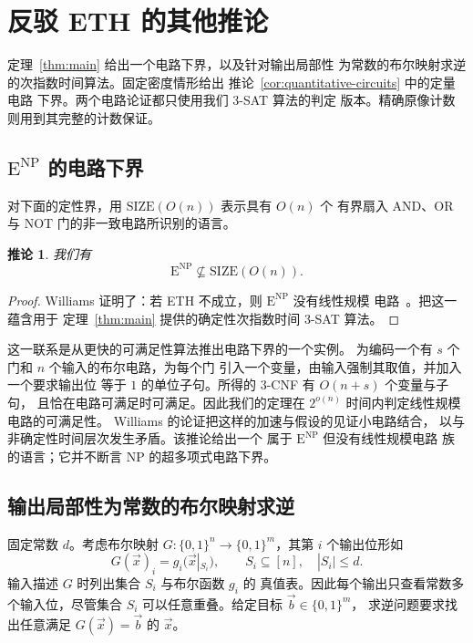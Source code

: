 \documentclass[11pt,reqno]{amsart}
\numberwithin{equation}{section}
\newtheorem{corollary}[theorem]{推论}
\theoremstyle{definition}\newtheorem{definition}[theorem]{定义}
\theoremstyle{remark}\newtheorem{remark}[theorem]{注}
\renewcommand{\le}{\leqslant}
\begin{document}
\raggedbottom

\section{反驳 ETH 的其他推论}\label{app:consequences}
定理~\ref{thm:main} 给出一个电路下界，以及针对输出局部性
为常数的布尔映射求逆的次指数时间算法。固定密度情形给出
推论~\ref{cor:quantitative-circuits} 中的定量电路
下界。两个电路论证都只使用我们 $3$-SAT 算法的判定
版本。精确原像计数则用到其完整的计数保证。

\subsection{$\mathrm E^{\mathrm{NP}}$ 的电路下界}\label{subsec:circuit-lower-bounds}
对下面的定性界，用 $\mathrm{SIZE}(O(n))$ 表示具有 $O(n)$ 个
有界扇入 AND、OR 与 NOT 门的非一致电路所识别的语言。

\begin{corollary}\label{cor:consequence-circuits}
我们有
\[
 \mathrm E^{\mathrm{NP}}\not\subseteq\mathrm{SIZE}(O(n)).
\]
\end{corollary}
\begin{proof}
Williams 证明了：若 ETH 不成立，则
$\mathrm E^{\mathrm{NP}}$ 没有线性规模
电路~\cite[定理~6.1]{Wil13}。把这一蕴含用于
定理~\ref{thm:main} 提供的确定性次指数时间 $3$-SAT 算法。
\end{proof}

这一联系是从更快的可满足性算法推出电路下界的一个实例。
为编码一个有 $s$ 个门和 $n$ 个输入的布尔电路，为每个门
引入一个变量，由输入强制其取值，并加入一个要求输出位
等于 $1$ 的单位子句。所得的 $3$-CNF 有 $O(n+s)$ 个变量与子句，
且恰在电路可满足时可满足。因此我们的定理在 $2^{o(n)}$
时间内判定线性规模电路的可满足性。
Williams 的论证把这样的加速与假设的见证小电路结合，
以与非确定性时间层次发生矛盾。该推论给出一个
属于 $\mathrm E^{\mathrm{NP}}$ 但没有线性规模电路
族的语言；它并不断言 NP 的超多项式电路下界。



\subsection{输出局部性为常数的布尔映射求逆}\label{subsec:local-inversion}
固定常数 $d$。考虑布尔映射
$G:\{0,1\}^n\to\{0,1\}^m$，其第 $i$ 个输出位形如
\[
 G(\vec{x})_i=g_i(\vec{x}|_{S_i}),
 \qquad S_i\subseteq[n],\quad |S_i|\le d.
\]
输入描述 $G$ 时列出集合 $S_i$ 与布尔函数 $g_i$ 的
真值表。因此每个输出只查看常数多个输入位，尽管集合
$S_i$ 可以任意重叠。给定目标 $\vec{b}\in\{0,1\}^m$，
求逆问题要求找出任意满足 $G(\vec{x})=\vec{b}$ 的 $\vec{x}$。
\end{document}
